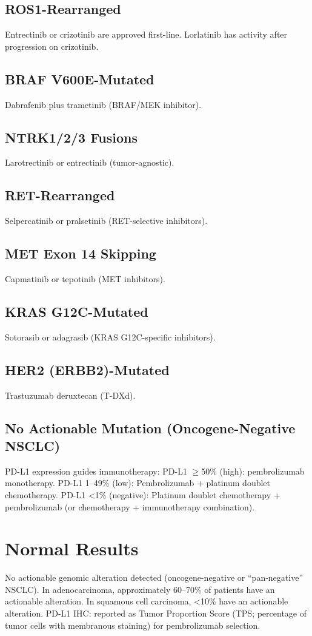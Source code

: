 \subsection*{ROS1-Rearranged}
Entrectinib or crizotinib are approved first-line. Lorlatinib has activity after progression on crizotinib.

\subsection*{BRAF V600E-Mutated}
Dabrafenib plus trametinib (BRAF/MEK inhibitor).

\subsection*{NTRK1/2/3 Fusions}
Larotrectinib or entrectinib (tumor-agnostic).

\subsection*{RET-Rearranged}
Selpercatinib or pralsetinib (RET-selective inhibitors).

\subsection*{MET Exon 14 Skipping}
Capmatinib or tepotinib (MET inhibitors).

\subsection*{KRAS G12C-Mutated}
Sotorasib or adagrasib (KRAS G12C-specific inhibitors).

\subsection*{HER2 (ERBB2)-Mutated}
Trastuzumab deruxtecan (T-DXd).

\subsection*{No Actionable Mutation (Oncogene-Negative NSCLC)}
PD-L1 expression guides immunotherapy: PD-L1 $\geq$50\% (high): pembrolizumab monotherapy. PD-L1 1--49\% (low): Pembrolizumab + platinum doublet chemotherapy. PD-L1 <1\% (negative): Platinum doublet chemotherapy + pembrolizumab (or chemotherapy + immunotherapy combination).

\section*{Normal Results}
No actionable genomic alteration detected (oncogene-negative or ``pan-negative'' NSCLC). In adenocarcinoma, approximately 60--70\% of patients have an actionable alteration. In squamous cell carcinoma, <10\% have an actionable alteration. PD-L1 IHC: reported as Tumor Proportion Score (TPS; percentage of tumor cells with membranous staining) for pembrolizumab selection.

